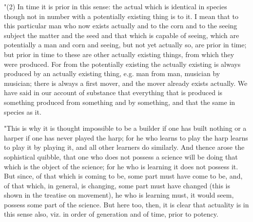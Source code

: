 "(2) In time it is prior in this sense: the actual which is identical
in species though not in number with a potentially existing thing
is to it. I mean that to this particular man who now exists actually
and to the corn and to the seeing subject the matter and the seed
and that which is capable of seeing, which are potentially a man and
corn and seeing, but not yet actually so, are prior in time; but prior
in time to these are other actually existing things, from which they
were produced. For from the potentially existing the actually existing
is always produced by an actually existing thing, e.g. man from man,
musician by musician; there is always a first mover, and the mover
already exists actually. We have said in our account of substance
that everything that is produced is something produced from something
and by something, and that the same in species as it. 

"This is why it is thought impossible to be a builder if one has built
nothing or a harper if one has never played the harp; for he who learns
to play the harp learns to play it by playing it, and all other learners
do similarly. And thence arose the sophistical quibble, that one who
does not possess a science will be doing that which is the object
of the science; for he who is learning it does not possess it. But
since, of that which is coming to be, some part must have come to
be, and, of that which, in general, is changing, some part must have
changed (this is shown in the treatise on movement), he who is learning
must, it would seem, possess some part of the science. But here too,
then, it is clear that actuality is in this sense also, viz. in order
of generation and of time, prior to potency. 

